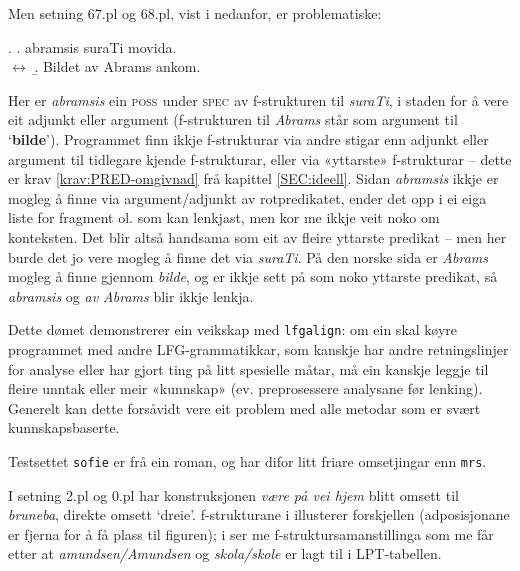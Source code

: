\documentclass[12pt,a4paper,oneside,draft]{report}
\newcommand{\F}[2]{\textsc{#1}\ensuremath{_{#2}}}
\newcommand{\SPEC}{\F{spec}{}}
\newcommand{\POSS}{\F{poss}{}}
\newcommand{\p}[1]{`\textbf{#1}'}
\begin{document}
Men setning 67.pl og 68.pl, vist i \Next nedanfor, er problematiske:

\ex. \a. abramsis suraTi movida.\\
     $\leftrightarrow$
     \b. Bildet av Abrams ankom.

Her er \emph{abramsis} ein \POSS{} under \SPEC{} av f\hyp{}strukturen til
 \emph{suraTi}, i staden for å vere eit adjunkt eller argument
 (f\hyp{}strukturen til \emph{Abrams} står som argument til
 \p{bilde}). Programmet finn ikkje f\hyp{}strukturar via andre stigar enn
 adjunkt eller argument til tidlegare kjende f\hyp{}strukturar, eller via
 «yttarste» f\hyp{}strukturar -- dette er krav \ref{krav:PRED-omgivnad} frå
 kapittel \ref{SEC:ideell}. Sidan \emph{abramsis} ikkje er mogleg å finne
 via argument/adjunkt av rotpredikatet, ender det opp i ei eiga liste
 for fragment ol. som kan lenkjast, men kor me ikkje veit noko om
 konteksten. Det blir altså handsama som eit av fleire yttarste
 predikat -- men her burde det jo vere mogleg å finne det via
 \emph{suraTi}. På den norske sida er \emph{Abrams} mogleg å finne gjennom
 \emph{bilde}, og er ikkje sett på som noko yttarste predikat, så
 \emph{abramsis} og \emph{av Abrams} blir ikkje lenkja.

Dette dømet demonstrerer ein veikskap med \texttt{lfgalign}: om ein skal
 køyre programmet med andre LFG-grammatikkar, som kanskje har andre
 retningslinjer for analyse eller har gjort ting på litt spesielle
 måtar, må ein kanskje leggje til fleire unntak eller meir «kunnskap»
 (ev. preprosessere analysane før lenking). Generelt kan dette
 forsåvidt vere eit problem med alle metodar som er svært
 kunnskapsbaserte.


Testsettet \texttt{sofie} er frå ein roman, og har difor litt friare
 omsetjingar enn \texttt{mrs}.

I setning 2.pl og 0.pl har konstruksjonen \emph{være på vei hjem} blitt
 omsett til \emph{bruneba}, direkte omsett `dreie'. f\hyp{}strukturane i \Next
 illusterer forskjellen (adposisjonane er fjerna for å få plass til
 figuren); i \NNext ser me f\hyp{}struktursamanstillinga som me får etter
 at \emph{amundsen/Amundsen} og \emph{skola/skole} er lagt til i LPT-tabellen.
\end{document}

